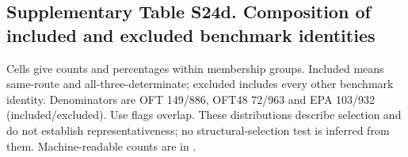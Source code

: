 \subsection*{Supplementary Table S24d. Composition of included and excluded benchmark identities}

Cells give counts and percentages within membership groups. Included means same-route and all-three-determinate; excluded includes every other benchmark identity. Denominators are OFT 149/886, OFT48 72/963 and EPA 103/932 (included/excluded). Use flags overlap. These distributions describe selection and do not establish representativeness; no structural-selection test is inferred from them. Machine-readable counts are in .

\begingroup\fontsize{8.5}{10.2}\selectfont\setlength{\tabcolsep}{3.5pt}

